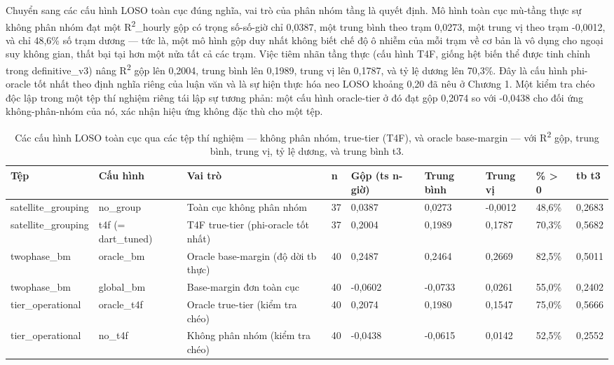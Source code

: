 Chuyển sang các cấu hình LOSO toàn cục đúng nghĩa, vai trò của phân nhóm tầng là quyết định. Mô hình toàn cục mù-tầng thực sự không phân nhóm đạt một R\textsuperscript{2}\_hourly gộp có trọng số-số-giờ chỉ 0,0387, một trung bình theo trạm 0,0273, một trung vị theo trạm -0,0012, và chỉ 48,6\% số trạm dương --- tức là, một mô hình gộp duy nhất không biết chế độ ô nhiễm của mỗi trạm về cơ bản là vô dụng cho ngoại suy không gian, thất bại tại hơn một nửa tất cả các trạm. Việc tiêm nhãn tầng thực (cấu hình T4F, giống hệt biến thể được tinh chỉnh trong definitive\_v3) nâng R\textsuperscript{2} gộp lên 0,2004, trung bình lên 0,1989, trung vị lên 0,1787, và tỷ lệ dương lên 70,3\%. Đây là cấu hình phi-oracle tốt nhất theo định nghĩa riêng của luận văn và là sự hiện thực hóa neo LOSO khoảng 0,20 đã nêu ở Chương 1. Một kiểm tra chéo độc lập trong một tệp thí nghiệm riêng tái lập sự tương phản: một cấu hình oracle-tier ở đó đạt gộp 0,2074 so với -0,0438 cho đối ứng không-phân-nhóm của nó, xác nhận hiệu ứng không đặc thù cho một tệp.

{\small
\begin{longtable}{lllllllll}
\caption{Các cấu hình LOSO toàn cục qua các tệp thí nghiệm --- không phân nhóm, true-tier (T4F), và oracle base-margin --- với R\textsuperscript{2} gộp, trung bình, trung vị, tỷ lệ dương, và trung bình t3.}\\
\toprule
\textbf{Tệp} & \textbf{Cấu hình} & \textbf{Vai trò} & \textbf{n} & \textbf{Gộp (ts n-giờ)} & \textbf{Trung bình} & \textbf{Trung vị} & \textbf{\% > 0} & \textbf{tb t3} \\
\midrule\endhead
satellite\_grouping & no\_group & Toàn cục không phân nhóm & 37 & 0,0387 & 0,0273 & -0,0012 & 48,6\% & 0,2683 \\
satellite\_grouping & t4f (= dart\_tuned) & T4F true-tier (phi-oracle tốt nhất) & 37 & 0,2004 & 0,1989 & 0,1787 & 70,3\% & 0,5682 \\
twophase\_bm & oracle\_bm & Oracle base-margin (độ dời tb thực) & 40 & 0,2487 & 0,2464 & 0,2669 & 82,5\% & 0,5011 \\
twophase\_bm & global\_bm & Base-margin đơn toàn cục & 40 & -0,0602 & -0,0733 & 0,0261 & 55,0\% & 0,2402 \\
tier\_operational & oracle\_t4f & Oracle true-tier (kiểm tra chéo) & 40 & 0,2074 & 0,1980 & 0,1547 & 75,0\% & 0,5666 \\
tier\_operational & no\_t4f & Không phân nhóm (kiểm tra chéo) & 40 & -0,0438 & -0,0615 & 0,0142 & 52,5\% & 0,2552 \\
\bottomrule
\end{longtable}
}


